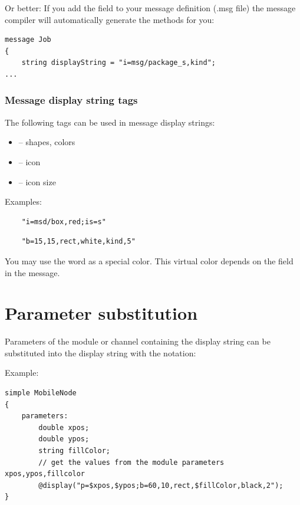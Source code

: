 Or better: If you add the field  to your message
definition (.msg file) the message compiler will automatically generate
the  methods for you:

\begin{verbatim}
message Job
{
    string displayString = "i=msg/package_s,kind";
...
\end{verbatim}

\subsubsection{Message display string tags}

The following tags can be used in message display strings:
\begin{itemize}
  \item{ -- shapes, colors}
  \item{ -- icon}
  \item{ -- icon size}
\end{itemize}

Examples:
\begin{verbatim}
    "i=msd/box,red;is=s"
\end{verbatim}

\begin{verbatim}
    "b=15,15,rect,white,kind,5"
\end{verbatim}

\begin{note}
   You may use the word  as a special color. This virtual color depends on
   the  field in the message.
\end{note}



\section{Parameter substitution}

Parameters of the module or channel containing the
display string can be substituted into the display string
with the  notation:

Example:
\begin{verbatim}
simple MobileNode
{
    parameters:
        double xpos;
        double ypos;
        string fillColor;
        // get the values from the module parameters xpos,ypos,fillcolor
        @display("p=$xpos,$ypos;b=60,10,rect,$fillColor,black,2");
}
\end{verbatim}

